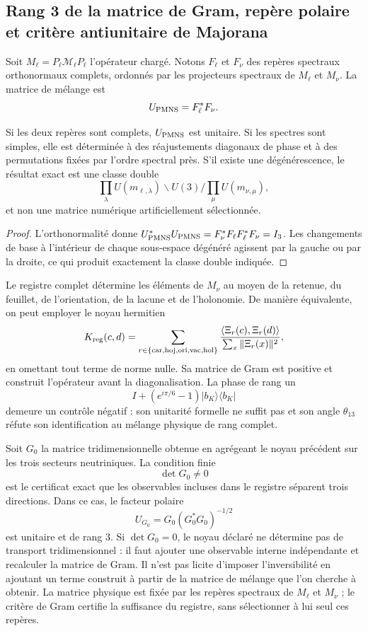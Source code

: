 \subsection{Rang 3 de la matrice de Gram, repère polaire et critère antiunitaire de Majorana}

Soit \(M_\ell=P_\ell\mathcal M_\ell P_\ell\) l'opérateur chargé. Notons
\(F_\ell\) et \(F_\nu\) des repères spectraux orthonormaux complets, ordonnés par
les projecteurs spectraux de \(M_\ell\) et \(M_\nu\). La matrice de mélange est
\[
 U_{\rm PMNS}=F_\ell^*F_\nu.
\]

\begin{theorem}
Si les deux repères sont complets, \(U_{\rm PMNS}\) est unitaire. Si les
spectres sont simples, elle est déterminée à des réajustements diagonaux de phase et à des
permutations fixées par l'ordre spectral près. S'il existe une dégénérescence, le
résultat exact est une classe double
\[
 \prod_\lambda U(m_{\ell,\lambda})
 \backslash U(3) /
 \prod_\mu U(m_{\nu,\mu}),
\]
et non une matrice numérique artificiellement sélectionnée.
\end{theorem}

\begin{proof}
L'orthonormalité donne
\(U_{\rm PMNS}^*U_{\rm PMNS}=F_\nu^*F_\ell F_\ell^*F_\nu=I_3\).
Les changements de base à l'intérieur de chaque sous-espace dégénéré agissent par la
gauche ou par la droite, ce qui produit exactement la classe double
indiquée.
\end{proof}

Le registre complet détermine les éléments de \(M_\nu\) au moyen de la retenue,
du feuillet, de l'orientation, de la lacune et de l'holonomie. De manière équivalente, on peut employer
le noyau hermitien
\[
 K_{\rm reg}(c,d)
 =\sum_{r\in\{\rm car,hoj,ori,vac,hol\}}
 \frac{\langle\Xi_r(c),\Xi_r(d)\rangle}
      {\sum_x\|\Xi_r(x)\|^2},
\]
en omettant tout terme de norme nulle. Sa matrice de Gram est positive et
construit l'opérateur avant la diagonalisation. La phase de rang un
\[
 I+(e^{i\pi/6}-1)|b_K\rangle\langle b_K|
\]
demeure un contrôle négatif : son unitarité formelle ne suffit pas et son angle
\(\theta_{13}\) réfute son identification au mélange physique de rang
complet.

Soit \(G_0\) la matrice tridimensionnelle obtenue en agrégeant le noyau précédent
sur les trois secteurs neutriniques. La condition finie
\[
 \det G_0\ne0
\]
est le certificat exact que les observables incluses dans le registre
séparent trois directions. Dans ce cas, le facteur polaire
\[
 U_{G_0}=G_0(G_0^*G_0)^{-1/2}
\]
est unitaire et de rang \(3\). Si \(\det G_0=0\), le noyau déclaré ne
détermine pas de transport tridimensionnel : il faut ajouter une observable interne
indépendante et recalculer la matrice de Gram. Il n'est pas licite d'imposer
l'inversibilité en ajoutant un terme construit à partir de la matrice de mélange
que l'on cherche à obtenir. La matrice physique est fixée par les repères
spectraux de \(M_\ell\) et \(M_\nu\) ; le critère de Gram certifie la suffisance
du registre, sans sélectionner à lui seul ces repères.

